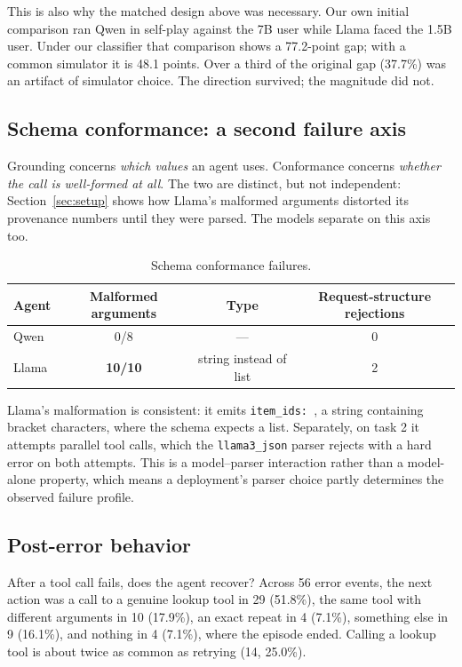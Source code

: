\documentclass{article}
\begin{document}
This is also why the matched design above was necessary. Our own initial comparison ran Qwen in self-play against the 7B user while Llama faced the 1.5B user. Under our classifier that comparison shows a 77.2-point gap; with a common simulator it is 48.1 points. Over a third of the original gap (37.7\%) was an artifact of simulator choice. The direction survived; the magnitude did not.

\subsection{Schema conformance: a second failure axis}
\label{sec:schema}

Grounding concerns \emph{which values} an agent uses. Conformance concerns \emph{whether the call is well-formed at all}. The two are distinct, but not independent: Section~\ref{sec:setup} shows how Llama's malformed arguments distorted its provenance numbers until they were parsed. The models separate on this axis too.

\begin{table}[h]
\centering
\caption{Schema conformance failures.}
\begin{tabular}{lccc}
\toprule
Agent & Malformed arguments & Type & Request-structure rejections \\
\midrule
Qwen & 0/8 & --- & 0 \\
Llama & \textbf{10/10} & string instead of list & 2 \\
\bottomrule
\end{tabular}
\end{table}

Llama's malformation is consistent: it emits \texttt{item\_ids:\ \textquotesingle[1151293680]\textquotesingle}, a string containing bracket characters, where the schema expects a list. Separately, on task 2 it attempts parallel tool calls, which the \texttt{llama3\_json} parser rejects with a hard error on both attempts. This is a model--parser interaction rather than a model-alone property, which means a deployment's parser choice partly determines the observed failure profile.

\subsection{Post-error behavior}

After a tool call fails, does the agent recover? Across 56 error events, the next action was a call to a genuine lookup tool in 29 (51.8\%), the same tool with different arguments in 10 (17.9\%), an exact repeat in 4 (7.1\%), something else in 9 (16.1\%), and nothing in 4 (7.1\%), where the episode ended. Calling a lookup tool is about twice as common as retrying (14, 25.0\%).
\end{document}
